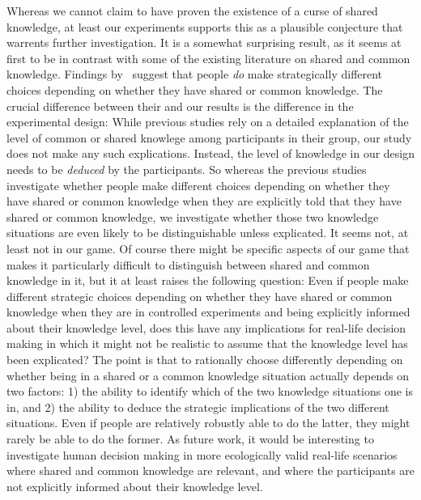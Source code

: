\documentclass[twocolumn,a4paper,superscriptaddress,nofootinbib]{revtex4}
\begin{document}
Whereas we cannot claim to have proven the existence of a curse of shared knowledge, at least our experiments supports this as a plausible conjecture that warrents further investigation. It is a somewhat surprising result, as it seems at first to be in contrast with some of the existing literature on shared and common knowledge. 
Findings by~\cite{lee2010rationales, thomas2014psychology, thomas2016recursive, thomas2018common, de2019common, de2019maimonides} suggest that people \emph{do} make strategically different choices depending on whether they have shared or common knowledge. 
The crucial difference between their and our results is the difference in the experimental design: While previous studies rely on a detailed explanation of the level of common or shared knowlege among participants in their group, our study does not make any such explications. Instead, the level of knowledge in our design needs to be \emph{deduced} by the participants. %
So whereas the previous studies investigate whether people make different choices depending on whether they have shared or common knowledge when they are explicitly told that they have shared or common knowledge, we investigate whether those two knowledge situations are even likely to be distinguishable unless explicated. It seems not, at least not in our game. Of course there might be specific aspects of our game that makes it particularly difficult to distinguish between shared and common knowledge in it, but it at least raises the following question: Even if people make different strategic choices depending on whether they have shared or common knowledge when they are in controlled experiments and being explicitly informed about their knowledge level, does this have any implications for real-life decision making in which it might not be realistic to assume that the knowledge level has been explicated? The point is that to rationally choose differently depending on whether being in a shared or a common knowledge situation actually depends on two factors: 1) the ability to identify which of the two knowledge situations one is in, and 2) the ability to deduce the strategic implications of the two different situations.  Even if people are relatively robustly able to do the latter, they might rarely be able to do the former. As future work, it would be interesting to investigate human decision making in more ecologically valid real-life scenarios where shared and common knowledge are relevant, and where the participants are not explicitly informed about their knowledge level.
\end{document}
